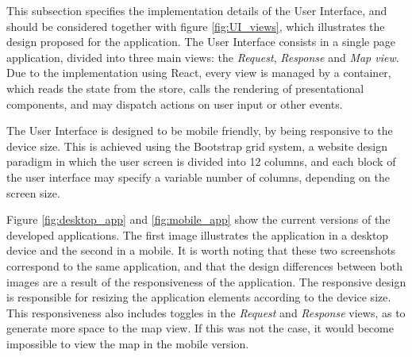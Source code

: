 This subsection specifies the implementation details of the User Interface,
and should be considered together with figure \ref{fig:UI_views}, 
which illustrates the design proposed for the application.
The User Interface consists in a single page application,
divided into three main views: the \textit{Request}, \textit{Response} and \textit{Map view}.
Due to the implementation using React, every view is managed by a container,
which reads the state from the store, calls the rendering of presentational components,
and may dispatch actions on user input or other events. 

The User Interface is designed to be mobile friendly, by being responsive to the 
device size. This is achieved using the Bootstrap grid system, 
a website design paradigm in which the user screen is divided into 12 columns,
and each block of the user interface may specify a variable number of columns, depending on the screen size.

Figure \ref{fig:desktop_app} and \ref{fig:mobile_app} show the current versions of the developed applications.
The first image illustrates the application in a desktop device and the second in a mobile.
It is worth noting that these two screenshots correspond to the same application,
and that the design differences between both images are a result of the responsiveness of the application.
The responsive design is responsible for resizing the application elements according to the device size.
This responsiveness also includes toggles in the \textit{Request} and \textit{Response} views, as to generate more space 
to the map view. If this was not the case, it would become impossible to view the map in the mobile version.  


